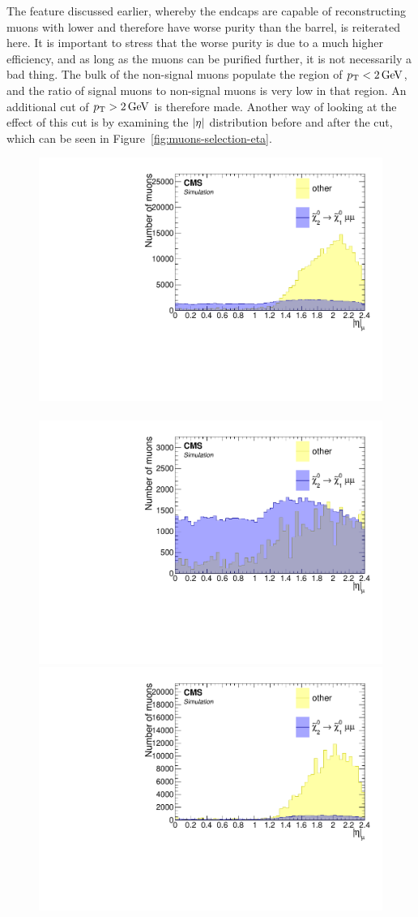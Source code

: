 The feature discussed earlier, whereby the endcaps are capable of reconstructing muons with lower \pt and therefore have worse purity than the barrel, is reiterated here. It is important to stress that the worse purity is due to a much higher efficiency, and as long as the muons can be purified further, it is not necessarily a bad thing. The bulk of the non-signal muons populate the region of $p_{\mathrm{T}}<2\,\text{Ge\hspace{-.08em}V}$, and the ratio of signal muons to non-signal muons is very low in that region. An additional cut of $p_{\mathrm{T}}>2\,\text{Ge\hspace{-.08em}V}$ is therefore made. Another way of looking at the effect of this cut is by examining the $\lvert \eta \rvert$ distribution before and after the \pt cut, which can be seen in Figure~\ref{fig:muons-selection-eta}.

\begin{figure}[!htb]
\centering
\includegraphics[width=0.48\linewidth]{plots/lepton_selection/lepton_selection_dm5p63/none_Muons_Eta.pdf} \,
\includegraphics[width=0.48\linewidth]{plots/lepton_selection/lepton_selection_dm5p63/none_Muons_Eta_after_pt.pdf} \\
\includegraphics[width=0.48\linewidth]{plots/lepton_selection/lepton_selection_dm1p92/none_Muons_Eta.pdf}  \,

\end{figure}
